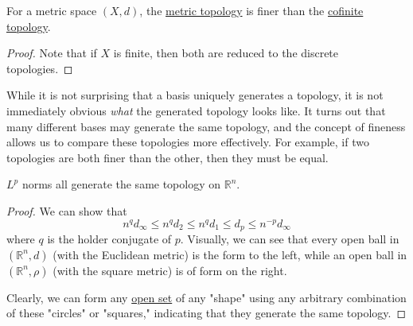   \begin{theorem}
    \label{thm:metric-topology-is-always-finer-than-cofinite}
    For a metric space $(X, d)$, the \hyperref[def:metric-topology]{metric topology} is finer than the \hyperref[def:cofinite-topology]{cofinite topology}. 
  \end{theorem} 
  \begin{proof}
    Note that if $X$ is finite, then both are reduced to the discrete topologies. 
  \end{proof}

  While it is not surprising that a basis uniquely generates a topology, it is not immediately obvious \textit{what} the generated topology looks like. It turns out that many different bases may generate the same topology, and the concept of fineness allows us to compare these topologies more effectively. For example, if two topologies are both finer than the other, then they must be equal. 

  \begin{theorem}
    \label{thm:lp-norms-euclidean-topology}
    $L^p$ norms all generate the same topology on $\mathbb{R}^n$. 
  \end{theorem}
  \begin{proof}
    We can show that 
    \begin{equation}
      n^q d_\infty \leq n^q d_2 \leq n^q d_1 \leq d_p \leq n^{-p} d_\infty
    \end{equation}
    where $q$ is the holder conjugate of $p$. Visually, we can see that every open ball in $(\mathbb{R}^n, d)$ (with the Euclidean metric) is the form to the left, while an open ball in $(\mathbb{R}^n, \rho)$ (with the square metric) is of form on the right. 
    \begin{center}
    \end{center}
    Clearly, we can form any \hyperref[def:open-set]{open set} of any "shape" using any arbitrary combination of these "circles" or "squares," indicating that they generate the same topology. 
  \end{proof}


